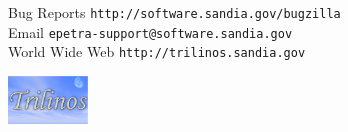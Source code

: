 \documentclass[11pt,twoside,titlepage]{EpetraDoc}
\begin{document}
\label{Contacts}
Bug Reports \hfill \texttt{http://software.sandia.gov/bugzilla} \\
Email \hfill \texttt{epetra-support@software.sandia.gov} \\
World Wide Web \hfill \texttt{http://trilinos.sandia.gov}

\vspace*{\fill}
\includegraphics[height=0.5in]{trilinos.eps}
\hfill

\cleardoublepage
\tableofcontents

\cleardoublepage
\listoffigures

\cleardoublepage
\listoftables

\clearpage



\cleardoublepage
%
%

\cleardoublepage
\printindex
%
\end{document}
